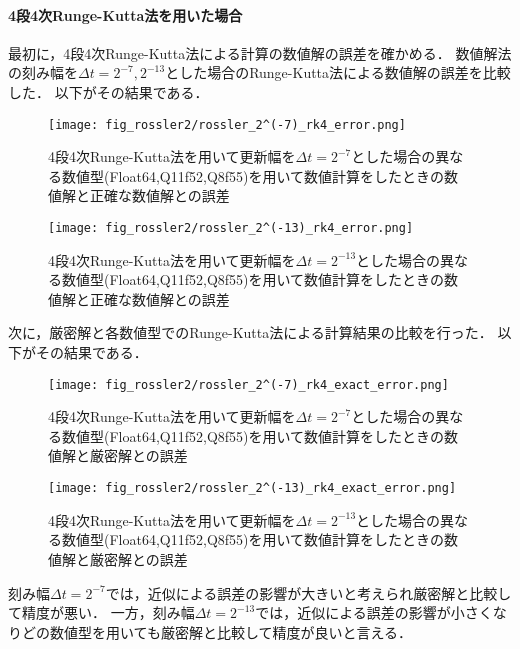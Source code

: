 \paragraph*{4段4次Runge-Kutta法を用いた場合}
最初に，4段4次Runge-Kutta法による計算の数値解の誤差を確かめる．
数値解法の刻み幅を$\Delta t = 2^{-7},2^{-13}$とした場合のRunge-Kutta法による数値解の誤差を比較した．
以下がその結果である．
\begin{figure}[H]
    \centering
    \begin{minipage}[b]{0.49\columnwidth}
        \centering
        \texttt{[image: fig\_rossler2/rossler\_2^(-7)\_rk4\_error.png]}
        \caption{4段4次Runge-Kutta法を用いて更新幅を$\Delta t = 2^{-7}$とした場合の異なる数値型(Float64,Q11f52,Q8f55)を用いて数値計算をしたときの数値解と正確な数値解との誤差}
        \label{fig:rossler_2^(-7)_rk4_error}
    \end{minipage}
    \begin{minipage}[b]{0.49\columnwidth}
        \centering
        \texttt{[image: fig\_rossler2/rossler\_2^(-13)\_rk4\_error.png]}
        \caption{4段4次Runge-Kutta法を用いて更新幅を$\Delta t =  2^{-13}$とした場合の異なる数値型(Float64,Q11f52,Q8f55)を用いて数値計算をしたときの数値解と正確な数値解との誤差}
        \label{fig:rossler_2^(-13)_rk4_error}
    \end{minipage}   
\end{figure}


次に，厳密解と各数値型でのRunge-Kutta法による計算結果の比較を行った．
以下がその結果である．\\
\begin{figure}[H]
    \centering
    \begin{minipage}[b]{0.49\columnwidth}
        \centering
        \texttt{[image: fig\_rossler2/rossler\_2^(-7)\_rk4\_exact\_error.png]}
        \caption{4段4次Runge-Kutta法を用いて更新幅を$\Delta t = 2^{-7}$とした場合の異なる数値型(Float64,Q11f52,Q8f55)を用いて数値計算をしたときの数値解と厳密解との誤差}   
        \label{fig:rossler_2^(-7)_exact_error}
    \end{minipage}
    \begin{minipage}[b]{0.49\columnwidth}
        \centering
        \texttt{[image: fig\_rossler2/rossler\_2^(-13)\_rk4\_exact\_error.png]}
        \caption{4段4次Runge-Kutta法を用いて更新幅を$\Delta t =  2^{-13}$とした場合の異なる数値型(Float64,Q11f52,Q8f55)を用いて数値計算をしたときの数値解と厳密解との誤差}
        \label{fig:rossler_2^(-13)_exact_error}
    \end{minipage}
\end{figure}
刻み幅$\Delta t = 2^{-7}$では，近似による誤差の影響が大きいと考えられ厳密解と比較して精度が悪い．
一方，刻み幅$\Delta t =  2^{-13}$では，近似による誤差の影響が小さくなりどの数値型を用いても厳密解と比較して精度が良いと言える．

